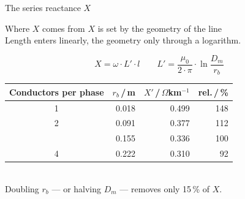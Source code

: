 %

\begin{frame}{The series reactance $X$}
  \begin{block}{Where $X$ comes from}
    {$X$ is set by the geometry of the line\\
    Length enters linearly, the geometry only through a logarithm.}
  \end{block}

  \vspace{0.8em}
  \[
    X = \omega\cdot L'\cdot l
    \qquad
    L' = \frac{\mu_0}{2\cdot\pi}\cdot\ln\frac{D_m}{r_b}
  \]

  \vspace{0.6em}
  \centering
  \renewcommand{\arraystretch}{1.15}
  {\footnotesize
  \begin{tabular}{@{}c r r r@{}}
    \textbf{Conductors per phase} & \multicolumn{1}{c}{\textbf{$r_b$}\,/\,m}
      & \multicolumn{1}{c}{\textbf{$X'$}\,/\,$\Omega$km$^{-1}$}
      & \multicolumn{1}{c}{\textbf{rel.}\,/\,\%} \\
    \hline
    1 & 0.018 & 0.499 & 148 \\
    2 & 0.091 & 0.377 & 112 \\
    \atrowhighlight 3 & 0.155 & 0.336 & 100 \\
    4 & 0.222 & 0.310 &  92 \\
    \hline
  \end{tabular}}\\[0.6em]
  {\color{atGray}\footnotesize Doubling $r_b$ --- or halving $D_m$ ---
  removes only 15\,\% of $X$.}
\end{frame}
